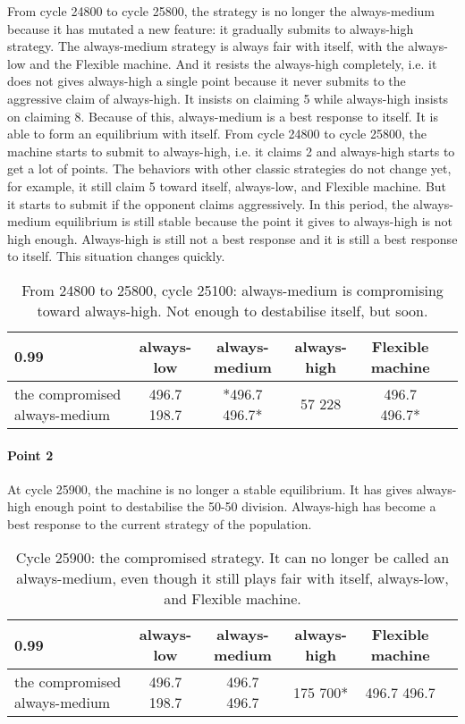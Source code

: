 \documentclass[12.5pt]{report}
\begin{document}
From cycle 24800 to cycle 25800, the strategy is no longer the always-medium because it has mutated a new feature: it gradually submits to always-high strategy. The always-medium strategy is always fair with itself, with the always-low and the Flexible machine. And it resists the always-high completely, i.e. it does not gives always-high a single point because it never submits to the aggressive claim of always-high. It insists on claiming 5 while always-high insists on claiming 8. Because of this, always-medium is a best response to itself. It is able to form an equilibrium with itself. From cycle 24800 to cycle 25800, the machine starts to submit to always-high, i.e. it claims 2 and always-high starts to get a lot of points. The behaviors with other classic strategies do not change yet, for example, it still claim 5 toward itself, always-low, and Flexible machine. But it starts to submit if the opponent claims aggressively. In this period, the always-medium equilibrium is still stable because the point it gives to always-high is not high enough. Always-high is still not a best response and it is still a best response to itself. This situation changes quickly.

\begin{table}[h!]
\center
\begin{tabular}{l|ccccc}
\textbf{0.99}& always-low & always-medium & always-high & Flexible machine\\
\hline
the compromised always-medium  &  496.7 198.7 &  *496.7 496.7*   &    57 228   &     496.7 496.7* \\
\end{tabular}
\caption{From 24800 to 25800, cycle 25100: always-medium is compromising toward always-high. Not enough to destabilise itself, but soon.}
\end{table}



\paragraph{Point 2}


At cycle 25900, the machine is no longer a stable equilibrium. It has gives always-high enough point to destabilise the 50-50 division. Always-high has become a best response to the current strategy of the population.

\begin{table}[h!]
\center
\begin{tabular}{l|ccccc}
\textbf{0.99}& always-low & always-medium & always-high & Flexible machine\\
\hline
the compromised always-medium  &  496.7 198.7 &   496.7 496.7   &    175 700*   &     496.7 496.7 \\
\end{tabular}
\caption{Cycle 25900: the compromised strategy. It can no longer be called an always-medium, even though it still plays fair with itself, always-low, and Flexible machine.}
\end{table}
\end{document}
